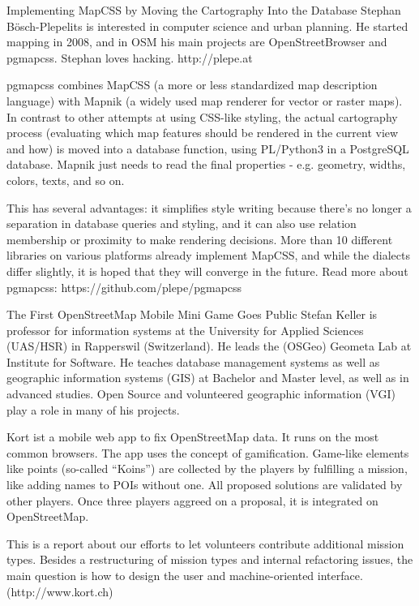 %
{Implementing MapCSS by Moving the Cartography Into the Database}%
{Stephan Bösch-Plepelits is interested in computer science and urban planning. He started mapping in 2008, and in OSM his main projects are OpenStreetBrowser and pgmapcss. Stephan loves hacking. http://plepe.at }%
{pgmapcss combines MapCSS (a more or less standardized map description language) with Mapnik (a widely used map renderer for vector or raster maps). In contrast to other attempts at using CSS-like styling, the actual cartography process (evaluating which map features should be rendered  in the current view and how) is moved into a database function, using PL/Python3 in a PostgreSQL database. Mapnik just needs to read the final properties - e.g. geometry, widths, colors, texts, and so on.

This has several advantages: it simplifies style writing because there's no longer a separation in database queries and styling, and it can also use relation membership or proximity to make rendering decisions. More than 10 different libraries on various platforms already implement MapCSS, and while the dialects differ slightly, it is hoped that they will converge in the future. Read more about pgmapcss: https://github.com/plepe/pgmapcss}


%
{The First OpenStreetMap Mobile Mini Game Goes Public}%
{Stefan Keller is professor for information systems at the University for Applied Sciences (UAS/HSR) in Rapperswil (Switzerland). He leads the (OSGeo) Geometa Lab at Institute for Software. He teaches database management systems as well as geographic information systems (GIS) at Bachelor and Master level, as well as in advanced studies. Open Source and volunteered geographic information (VGI) play a role in many of his projects. }%
{Kort ist a mobile web app to fix OpenStreetMap data. It runs on the most common browsers. The app uses the concept of gamification. Game-like elements like points (so-called ``Koins'') are collected by the players by fulfilling a mission, like adding names to POIs without one. All proposed solutions are validated by other players. Once three players aggreed on a proposal, it is integrated on OpenStreetMap.

This is a report about our efforts to let volunteers contribute additional mission types. Besides a restructuring of mission types and internal refactoring issues, the main question is how to design the user and machine-oriented interface. (http://www.kort.ch)}


